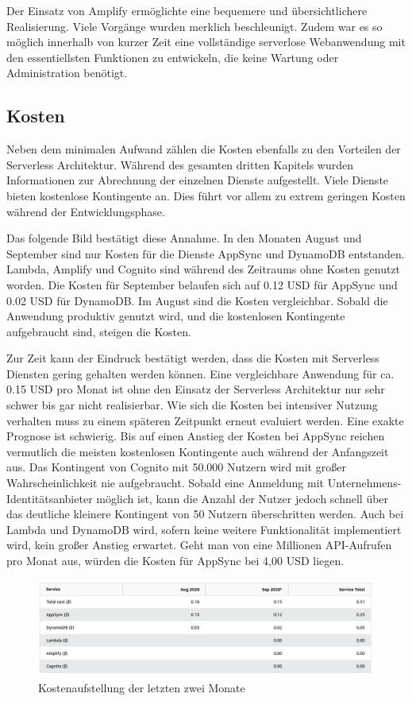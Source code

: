 Der Einsatz von Amplify ermöglichte eine bequemere und übersichtlichere Realisierung.
Viele Vorgänge wurden merklich beschleunigt.
Zudem war es so möglich innerhalb von kurzer Zeit eine vollständige serverlose Webanwendung mit den essentiellsten Funktionen zu entwickeln, die keine Wartung oder Administration benötigt.
\clearpage

\subsection{Kosten}
\label{Kosten}
Neben dem minimalen Aufwand zählen die Kosten ebenfalls zu den Vorteilen der Serverless Architektur.
Während des gesamten dritten Kapitels wurden Informationen zur Abrechnung der einzelnen Dienste aufgestellt.
Viele Dienste bieten kostenlose Kontingente an.
Dies führt vor allem zu extrem geringen Kosten während der Entwicklungsphase.

Das folgende Bild bestätigt diese Annahme.
In den Monaten August und September sind nur Kosten für die Dienste AppSync und DynamoDB entstanden.
Lambda, Amplify und Cognito sind während des Zeitraums ohne Kosten genutzt worden.
Die Kosten für September belaufen sich auf 0.12 USD für AppSync und 0.02 USD für DynamoDB.
Im August sind die Kosten vergleichbar.
Sobald die Anwendung produktiv genutzt wird, und die kostenlosen Kontingente aufgebraucht sind, steigen die Kosten.

Zur Zeit kann der Eindruck bestätigt werden, dass die Kosten mit Serverless Diensten gering gehalten werden können.
Eine vergleichbare Anwendung für ca. 0.15 USD pro Monat ist ohne den Einsatz der Serverless Architektur nur sehr schwer bis gar nicht realisierbar.
Wie sich die Kosten bei intensiver Nutzung verhalten muss zu einem späteren Zeitpunkt erneut evaluiert werden.
Eine exakte Prognose ist schwierig.
Bis auf einen Anstieg der Kosten bei AppSync reichen vermutlich die meisten kostenlosen Kontingente auch während der Anfangszeit aus.
Das Kontingent von Cognito mit 50.000 Nutzern wird mit großer Wahrscheinlichkeit nie aufgebraucht.
Sobald eine Anmeldung mit Unternehmens-Identitätsanbieter möglich ist, kann die Anzahl der Nutzer jedoch schnell über das deutliche kleinere Kontingent von 50 Nutzern überschritten werden.
Auch bei Lambda und DynamoDB wird, sofern keine weitere Funktionalität implementiert wird, kein großer Anstieg erwartet.
Geht man von eine Millionen API-Aufrufen pro Monat aus, würden die Kosten für AppSync bei 4,00 USD liegen.
\\
\begin{figure}[htbp]
    \centering
    \includegraphics[width=1.0\textwidth]{50-Implementierung/Kosten.png}
    \caption{Kostenaufstellung der letzten zwei Monate}
    \label{fig:kosten}
\end{figure}
\clearpage

